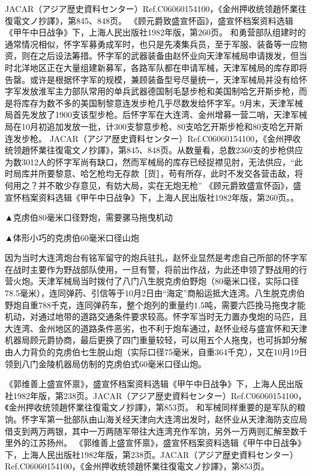 \documentclass[12pt,UTF8]{ctexbook}
\begin{document}
JACAR（アジア歴史資料センター）Ref.C06060154100，《金州押收统领趙怀業往復電文ノ抄譯》，第845、848页。
《顾元爵致盛宣怀函》，盛宣怀档案资料选辑《甲午中日战争》下，上海人民出版社1982年版，第260页。
和勇营部队组建时的通常情况相似，怀字军募勇成军时，也只是先凑集兵员，至于军服、装备等一应物资，则在之后设法筹措。怀字军的武器装备由赵怀业向天津军械局申请拨发，但当时北洋地区正在大量组建新募军，各路军队都在申请军械，天津军械局的库存即将告罄。或许是根据怀字军的规模，兼顾装备型号尽量统一，天津军械局并没有给怀字军发放淮军主力部队常用的单兵武器德国制毛瑟步枪和美国制哈乞开斯步枪，而是将库存为数不多的美国制黎意连发步枪几乎尽数发给怀字军。9月末，天津军械局首先发放了1900支该型步枪。后怀字军在大连湾、金州增募一营二哨，天津军械局在10月初追加发放一批，计300支黎意步枪、80支哈乞开斯步枪和80支哈乞开斯连发步枪。 JACAR（アジア歴史資料センター）Ref.C06060154100，《金州押收统领趙怀業往復電文ノ抄譯》，第845、848页。从数量看，总数2360支的步枪供应为数3012人的怀字军尚有缺口，然而军械局的库存已经捉襟见肘，无法供应，“此时局库并所要黎意、哈乞枪均无存款［货］，苟有所存，此时不发交各营击敌，将何用之？并不敢少存意见，有妨大局，实在无炮无枪” 《顾元爵致盛宣怀函》，盛宣怀档案资料选辑《甲午中日战争》下，上海人民出版社1982年版，第260页。。


▲克虏伯80毫米口径野炮，需要骡马拖曳机动


▲体形小巧的克虏伯60毫米口径山炮

因为当时大连湾炮台有铭军留守的炮兵驻扎，赵怀业显然是考虑自己所部的怀字军在战时主要作为野战部队使用，一旦有警，将前出作战，为此还申领了野战用的行营火炮。天津军械局当时拨付了八门八生脱克虏伯野炮（80毫米口径，实际口径78.5毫米），连同弹药、引信等于10月2日由“海定”商船运抵大连湾。八生脱克虏伯野炮自重788千克，连同弹药车，整个炮列的重量约1.5吨，需要六匹挽马拖曳才能机动，对通过地带的道路交通条件要求较高。怀字军当时无力置办曳炮的马匹，且大连湾、金州地区的道路条件恶劣，也不利于炮车通过，赵怀业经与盛宣怀和天津机器局顾元爵协商，最后更换了四门重量较轻，可以用五个人拖曳，也可拆卸分解由人力背负的克虏伯七生脱山炮（实际口径75毫米，自重364千克），又在10月19日领到八门金陵机器局仿制的克虏伯式60毫米口径山炮。

《郭维善上盛宣怀禀》，盛宣怀档案资料选辑《甲午中日战争》下，上海人民出版社1982年版，第238页。JACAR（アジア歴史資料センター）Ref.C06060154100，《金州押收统领趙怀業往復電文ノ抄譯》，第853页。
和军械同样重要的是军队的粮饷。怀字军第一批部队由山海关经天津向大连湾出发时，赵怀业从天津海防支应局借支到两万两银，其中一万两随军带往大连湾充作军饷，另外一万两则汇解至数千里外的江苏扬州。 《郭维善上盛宣怀禀》，盛宣怀档案资料选辑《甲午中日战争》下，上海人民出版社1982年版，第238页。JACAR（アジア歴史資料センター）Ref.C06060154100，《金州押收统领趙怀業往復電文ノ抄譯》，第853页。
\end{document}
